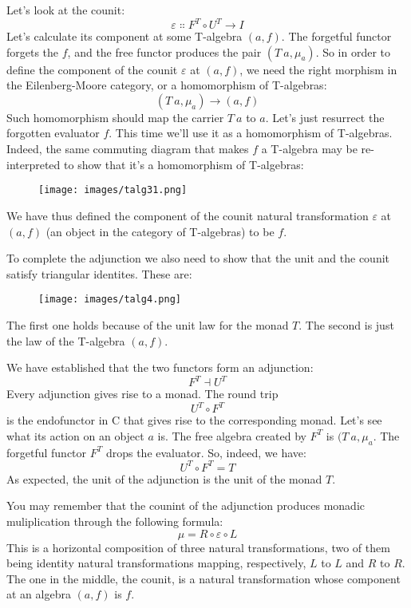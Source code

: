 Let's look at the counit:
\[\varepsilon \Colon F^T \circ U^T \to I\]
Let's calculate its component at some T-algebra $(a, f)$. The
forgetful functor forgets the $f$, and the free functor produces
the pair $(T\ a, \mu_a)$. So in order to define the component of
the counit $\varepsilon$ at $(a, f)$, we need the right morphism in
the Eilenberg-Moore category, or a homomorphism of T-algebras:
\[(T\ a, \mu_a) \to (a, f)\]
Such homomorphism should map the carrier $T\ a$ to $a$.
Let's just resurrect the forgotten evaluator $f$. This time we'll
use it as a homomorphism of T-algebras. Indeed, the same commuting
diagram that makes $f$ a T-algebra may be re-interpreted to show
that it's a homomorphism of T-algebras:

\begin{figure}[H]
\centering
\texttt{[image: images/talg31.png]}
\end{figure}

\noindent
We have thus defined the component of the counit natural transformation
$\varepsilon$ at $(a, f)$ (an object in the category of T-algebras)
to be $f$.

To complete the adjunction we also need to show that the unit and the
counit satisfy triangular identites. These are:

\begin{figure}[H]
\centering
\texttt{[image: images/talg4.png]}
\end{figure}

\noindent
The first one holds because of the unit law for the monad $T$.
The second is just the law of the T-algebra $(a, f)$.

We have established that the two functors form an adjunction:
\[F^T \dashv U^T\]
Every adjunction gives rise to a monad. The round trip
\[U^T \circ F^T\]
is the endofunctor in C that gives rise to the corresponding monad.
Let's see what its action on an object $a$ is. The free algebra
created by $F^T$ is $(T\ a, \mu_a$. The forgetful functor
$F^T$ drops the evaluator. So, indeed, we have:
\[U^T \circ F^T = T\]
As expected, the unit of the adjunction is the unit of the monad $T$.

You may remember that the counint of the adjunction produces monadic
muliplication through the following formula:
\[\mu = R \circ \varepsilon \circ L\]
This is a horizontal composition of three natural transformations, two
of them being identity natural transformations mapping, respectively,
$L$ to $L$ and $R$ to $R$. The one in the
middle, the counit, is a natural transformation whose component at an
algebra $(a, f)$ is $f$.

